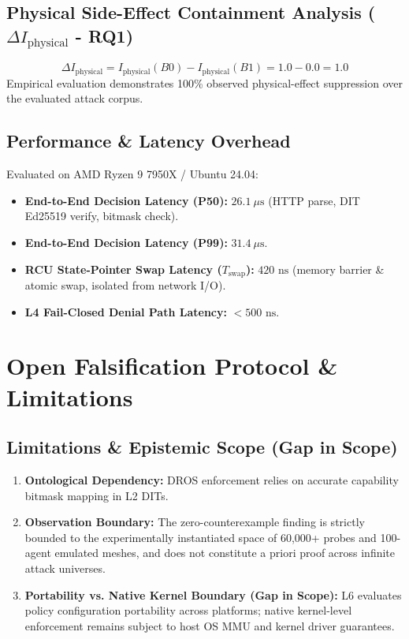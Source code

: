 \documentclass[conference]{IEEEtran}
\begin{document}
\subsection{Physical Side-Effect Containment Analysis ($\Delta I_{\text{physical}}$ - RQ1)}
\begin{equation}
\Delta I_{\text{physical}} = I_{\text{physical}}(B0) - I_{\text{physical}}(B1) = 1.0 - 0.0 = 1.0
\end{equation}
Empirical evaluation demonstrates 100\% observed physical-effect suppression over the evaluated attack corpus.

\subsection{Performance \& Latency Overhead}
Evaluated on AMD Ryzen 9 7950X / Ubuntu 24.04:
\begin{itemize}
    \item \textbf{End-to-End Decision Latency (P50):} $26.1\ \mu\text{s}$ (HTTP parse, DIT Ed25519 verify, bitmask check).
    \item \textbf{End-to-End Decision Latency (P99):} $31.4\ \mu\text{s}$.
    \item \textbf{RCU State-Pointer Swap Latency ($T_{\text{swap}}$):} $420\text{ ns}$ (memory barrier \& atomic swap, isolated from network I/O).
    \item \textbf{L4 Fail-Closed Denial Path Latency:} $<500\text{ ns}$.
\end{itemize}

\section{Open Falsification Protocol \& Limitations}
\subsection{Limitations \& Epistemic Scope (Gap in Scope)}
\begin{enumerate}
    \item \textbf{Ontological Dependency:} DROS enforcement relies on accurate capability bitmask mapping in L2 DITs.
    \item \textbf{Observation Boundary:} The zero-counterexample finding is strictly bounded to the experimentally instantiated space of 60,000+ probes and 100-agent emulated meshes, and does not constitute a priori proof across infinite attack universes.
    \item \textbf{Portability vs. Native Kernel Boundary (Gap in Scope):} L6 evaluates policy configuration portability across platforms; native kernel-level enforcement remains subject to host OS MMU and kernel driver guarantees.
\end{enumerate}
\end{document}
